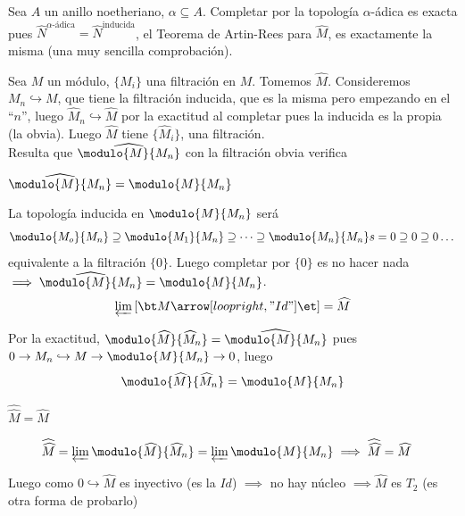 

Sea $A$ un anillo noetheriano, $\alpha \subseteq A$. Completar por la topología $\alpha$-ádica es exacta pues $\widehat{N}^{\alpha\text{-ádica}} = \widehat{N}^{\text{inducida}}$, el Teorema de Artin-Rees para $\widehat{M}$, es exactamente la misma (una muy sencilla comprobación).

Sea $M$ un m\'odulo, $\{M_i\}$ una filtración en $M$. Tomemos $\widehat{M}$. Consideremos $M_n \hookrightarrow M$, que tiene la filtración inducida, que es la misma pero empezando en el ``$n$'', luego $\widehat{M}_n \hookrightarrow \widehat{M}$ por la exactitud al completar pues la inducida es la propia (la obvia). Luego $\widehat{M}$ tiene $\{\widehat{M}_i\}$, una filtración. \\
Resulta que $\widehat{\modulo{M}{M_n}}$ con la filtración obvia verifica
\begin{lem}
     $\widehat{\modulo{M}{M_n}} = \modulo{M}{M_n}$ 
\end{lem}
\begin{dem}
    La topolog\'ia inducida en $\modulo{M}{M_n}$ ser\'a
\[ \modulo{M_o}{M_n} \supseteq \modulo{M_1}{M_n} \supseteq \dots \supseteq \modulo{M_n}{M_n}s = 0 \supseteq 0 \supseteq 0 \dots \]
equivalente a la filtración $\{0\}$. Luego completar por $\{0\}$ es no hacer nada $\implies \widehat{\modulo{M}{M_n}} = \modulo{M}{M_n}$.
\[ \varprojlim \left[  \bt M \arrow[loop right, "Id"] \et \right] = \widehat{M} \]
\end{dem}

Por la exactitud, $\modulo{\widehat{M}}{\widehat{M}_n} = \widehat{\modulo{M}{M_n}}$ pues $0 \to M_n \hookrightarrow M \to \modulo{M}{M_n} \to 0$, luego $$\modulo{\widehat{M}}{\widehat{M}_n} =\modulo{M}{M_n}$$

\begin{cor}
    $\widehat{\widehat{M}} = \widehat{M}$
\end{cor} 
\begin{dem}
    \begin{align*}\widehat{\widehat{M}} &= \varprojlim \modulo{\widehat{M}}{\widehat{M}_n} = \varprojlim \modulo{M}{M_n} \implies \widehat{\widehat{M}} = \widehat{M}
\end{align*}
\end{dem}

\noindent Luego como $0 \hookrightarrow \widehat{M}$ es inyectivo (es la $Id$) $\implies$ no hay núcleo $\implies \widehat{M}$ es $T_2$ (es otra forma de probarlo)
\vspace{0.5cm}

